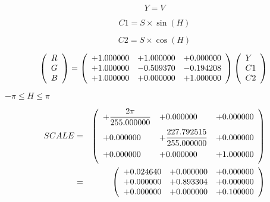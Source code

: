 \documentclass{article}
\begin{document}
\[ Y = V \]
\pagebreak

\[ C1 = S\times \sin \left(H\right) \]
\pagebreak

\[ C2 = S\times \cos \left(H\right) \]
\pagebreak

\[ \left( \begin{array}{l} R \\ G \\ B \\ \end{array} \right) = \left( \begin{array}{lll} +1.000000 & +1.000000 & +0.000000 \\ +1.000000 & -0.509370 & -0.194208 \\ +1.000000 & +0.000000 & +1.000000 \\ \end{array} \right) \left( \begin{array}{l} Y \\ C1 \\ C2 \\ \end{array} \right) \\ \]
\pagebreak

$ -\pi \le H \le \pi $
\pagebreak

\begin{eqnarray*} SCALE &=& \left( \begin{array}{lll} +\dfrac{2\pi}{255.000000} & +0.000000 & +0.000000 \vspace{.5em} \\ +0.000000 & +\dfrac{227.792515}{255.000000} & +0.000000 \vspace{.5em} \\ +0.000000 & +0.000000 & +1.000000 \vspace{.5em} \\ \end{array} \right) \\ &=& \left( \begin{array}{lll} +0.024640 & +0.000000 & +0.000000 \\ +0.000000 & +0.893304 & +0.000000 \\ +0.000000 & +0.000000 & +0.100000 \\ \end{array} \right) \\ \end{eqnarray*}
\pagebreak
\end{document}
